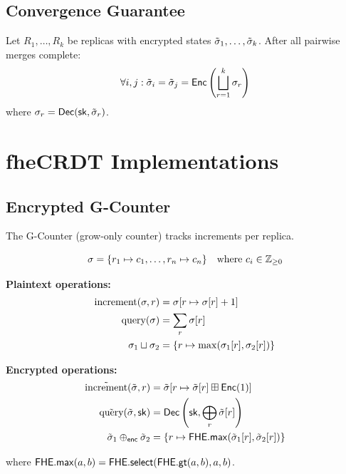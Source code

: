 \documentclass{../shared/luxfhe}
\begin{document}
\subsection{Convergence Guarantee}

\begin{theorem}
Let $R_1, \ldots, R_k$ be replicas with encrypted states $\tilde{\sigma}_1, \ldots, \tilde{\sigma}_k$. After all pairwise merges complete:
\[
\forall i, j: \tilde{\sigma}_i = \tilde{\sigma}_j = \mathsf{Enc}\left(\bigsqcup_{r=1}^{k} \sigma_r\right)
\]
where $\sigma_r = \mathsf{Dec}(\mathsf{sk}, \tilde{\sigma}_r)$.
\end{theorem}

\section{fheCRDT Implementations}

\subsection{Encrypted G-Counter}

The G-Counter (grow-only counter) tracks increments per replica.

\begin{definition}
\[
\sigma = \{r_1 \mapsto c_1, \ldots, r_n \mapsto c_n\} \quad \text{where } c_i \in \mathbb{Z}_{\geq 0}
\]
\end{definition}

\textbf{Plaintext operations:}
\begin{align}
\text{increment}(\sigma, r) &= \sigma[r \mapsto \sigma[r] + 1] \\
\text{query}(\sigma) &= \sum_{r} \sigma[r] \\
\sigma_1 \sqcup \sigma_2 &= \{r \mapsto \max(\sigma_1[r], \sigma_2[r])\}
\end{align}

\textbf{Encrypted operations:}
\begin{align}
\tilde{\text{increment}}(\tilde{\sigma}, r) &= \tilde{\sigma}[r \mapsto \tilde{\sigma}[r] \boxplus \mathsf{Enc}(1)] \\
\tilde{\text{query}}(\tilde{\sigma}, \mathsf{sk}) &= \mathsf{Dec}\left(\mathsf{sk}, \bigoplus_r \tilde{\sigma}[r]\right) \\
\tilde{\sigma}_1 \oplus_{\mathsf{enc}} \tilde{\sigma}_2 &= \{r \mapsto \mathsf{FHE.max}(\tilde{\sigma}_1[r], \tilde{\sigma}_2[r])\}
\end{align}

where $\mathsf{FHE.max}(a, b) = \mathsf{FHE.select}(\mathsf{FHE.gt}(a, b), a, b)$.
\end{document}
